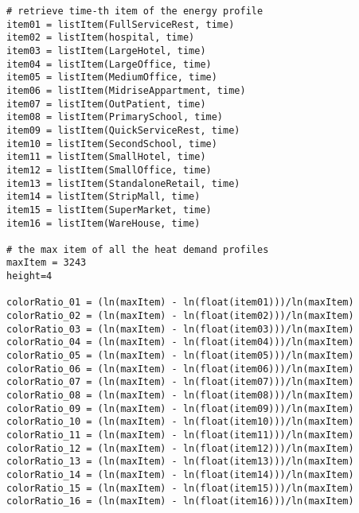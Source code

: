 \begin{multicols}{2}
\begin{verbatim}
# retrieve time-th item of the energy profile
item01 = listItem(FullServiceRest, time)
item02 = listItem(hospital, time)
item03 = listItem(LargeHotel, time)
item04 = listItem(LargeOffice, time)
item05 = listItem(MediumOffice, time)
item06 = listItem(MidriseAppartment, time)
item07 = listItem(OutPatient, time)
item08 = listItem(PrimarySchool, time)
item09 = listItem(QuickServiceRest, time)
item10 = listItem(SecondSchool, time)
item11 = listItem(SmallHotel, time)
item12 = listItem(SmallOffice, time)
item13 = listItem(StandaloneRetail, time)
item14 = listItem(StripMall, time)
item15 = listItem(SuperMarket, time)
item16 = listItem(WareHouse, time)

# the max item of all the heat demand profiles
maxItem = 3243
height=4

colorRatio_01 = (ln(maxItem) - ln(float(item01)))/ln(maxItem)
colorRatio_02 = (ln(maxItem) - ln(float(item02)))/ln(maxItem)
colorRatio_03 = (ln(maxItem) - ln(float(item03)))/ln(maxItem)
colorRatio_04 = (ln(maxItem) - ln(float(item04)))/ln(maxItem)
colorRatio_05 = (ln(maxItem) - ln(float(item05)))/ln(maxItem)
colorRatio_06 = (ln(maxItem) - ln(float(item06)))/ln(maxItem)
colorRatio_07 = (ln(maxItem) - ln(float(item07)))/ln(maxItem)
colorRatio_08 = (ln(maxItem) - ln(float(item08)))/ln(maxItem)
colorRatio_09 = (ln(maxItem) - ln(float(item09)))/ln(maxItem)
colorRatio_10 = (ln(maxItem) - ln(float(item10)))/ln(maxItem)
colorRatio_11 = (ln(maxItem) - ln(float(item11)))/ln(maxItem)
colorRatio_12 = (ln(maxItem) - ln(float(item12)))/ln(maxItem)
colorRatio_13 = (ln(maxItem) - ln(float(item13)))/ln(maxItem)
colorRatio_14 = (ln(maxItem) - ln(float(item14)))/ln(maxItem)
colorRatio_15 = (ln(maxItem) - ln(float(item15)))/ln(maxItem)
colorRatio_16 = (ln(maxItem) - ln(float(item16)))/ln(maxItem)


\end{verbatim}
\end{multicols}
